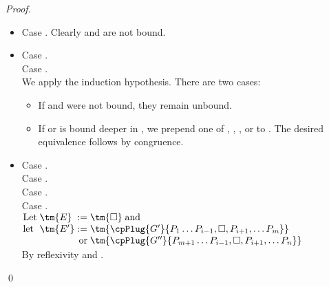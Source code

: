 \documentclass[UKenglish]{llncs}
\begin{document}
\begin{subappendices}
\begin{proof}
    \begin{itemize}
    \item
      Case \tm{\Box}. Clearly  and  are not bound.
    \item
      Case .\\
      Case .\\
      We apply the induction hypothesis. There are two cases:
      \begin{itemize}
      \item
        If  and  were not bound, they remain unbound.
      \item
        If  or  is bound deeper in , we prepend one of
        ,
        ,
        , or
         to .
        The desired equivalence follows by congruence.
      \end{itemize}
    \item
      Case .\\
      Case .\\
      Case .\\
      Case .
      \\
      \(\arraycolsep=0pt\begin{array}[t]{llrl}
        \text{Let} & \; \tm{E}  &\; :=     &\; \tm{\Box} \; \text{and} \\
        \text{let} & \; \tm{E'} &\; :=     &\; \tm{\cpPlug{G'}{P_1 \dots P_{i-1}, \Box, P_{i+1}, \dots P_m}} \\
                   &            &\text{or} &\; \tm{\cpPlug{G''}{P_{m+1} \dots P_{i-1}, \Box, P_{i+1}, \dots P_n}}
      \end{array}\)
      \\[1ex]
      By reflexivity and \cpEquivCutComm.
    \end{itemize}
    \qed
  \end{proof}
  \thmcpprogressbeta

\end{subappendices}
\end{document}
